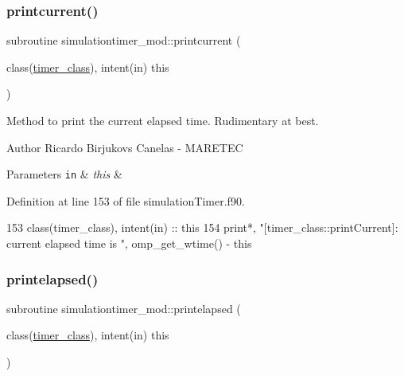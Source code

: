 \subsubsection{\texorpdfstring{printcurrent()}{printcurrent()}}
{\footnotesize\ttfamily subroutine simulationtimer\+\_\+mod\+::printcurrent (\begin{DoxyParamCaption}\item[{class(\mbox{\hyperlink{structsimulationtimer__mod_1_1timer__class}{timer\+\_\+class}}), intent(in)}]{this }\end{DoxyParamCaption})\hspace{0.3cm}{\ttfamily [private]}}



Method to print the current elapsed time. Rudimentary at best. 

\begin{DoxyAuthor}{Author}
Ricardo Birjukovs Canelas -\/ M\+A\+R\+E\+T\+EC 
\end{DoxyAuthor}

\begin{DoxyParams}[1]{Parameters}
\mbox{\tt in}  & {\em this} & \\
\hline
\end{DoxyParams}


Definition at line 153 of file simulation\+Timer.\+f90.


\begin{DoxyCode}
153     \textcolor{keywordtype}{class}(timer\_class), \textcolor{keywordtype}{intent(in)} :: this
154     print*, \textcolor{stringliteral}{"[timer\_class::printCurrent]: current elapsed time is "}, omp\_get\_wtime() - this%
\end{DoxyCode}
\mbox{\label{namespacesimulationtimer__mod_a9df6f995616d7fa53094178c3aff1fad}} 
\subsubsection{\texorpdfstring{printelapsed()}{printelapsed()}}
{\footnotesize\ttfamily subroutine simulationtimer\+\_\+mod\+::printelapsed (\begin{DoxyParamCaption}\item[{class(\mbox{\hyperlink{structsimulationtimer__mod_1_1timer__class}{timer\+\_\+class}}), intent(in)}]{this }\end{DoxyParamCaption})\hspace{0.3cm}{\ttfamily [private]}}




